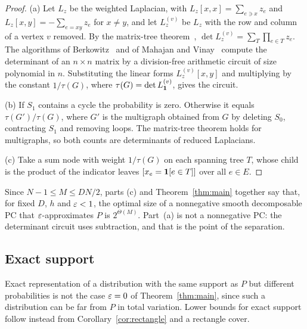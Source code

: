 \begin{proof}
(a) Let $L_z$ be the weighted Laplacian, with $L_z[x,x]=\sum_{e\ni x}z_e$ and $L_z[x,y]=-\sum_{e=xy}z_e$ for $x\ne y$, and let $L_z^{(v)}$ be $L_z$ with the row and column of a vertex $v$ removed. By the matrix-tree theorem~\cite{Kirchhoff1847}, $\det L_z^{(v)}=\sum_T\prod_{e\in T}z_e$. The algorithms of Berkowitz~\cite{Berkowitz84} and of Mahajan and Vinay~\cite{MahajanVinay99} compute the determinant of an $n\times n$ matrix by a division-free arithmetic circuit of size polynomial in $n$. Substituting the linear forms $L_z^{(v)}[x,y]$ and multiplying by the constant $1/\tau(G)$, where $\tau(G)=\det L_{\mathbf{1}}^{(v)}$, gives the circuit.

(b) If $S_1$ contains a cycle the probability is zero. Otherwise it equals $\tau(G')/\tau(G)$, where $G'$ is the multigraph obtained from $G$ by deleting $S_0$, contracting $S_1$ and removing loops. The matrix-tree theorem holds for multigraphs, so both counts are determinants of reduced Laplacians.

(c) Take a sum node with weight $1/\tau(G)$ on each spanning tree $T$, whose child is the product of the indicator leaves $[x_e=\mathbf{1}[e\in T]]$ over all $e\in E$.
\end{proof}

Since $N-1\le M\le DN/2$, parts (c) and Theorem~\ref{thm:main} together say that, for fixed $D$, $h$ and $\varepsilon<1$, the optimal size of a nonnegative smooth decomposable PC that $\varepsilon$-approximates $P$ is $2^{\Theta(M)}$. Part~(a) is not a nonnegative PC: the determinant circuit uses subtraction, and that is the point of the separation.

\subsection{Exact support}\label{sec:support}

Exact representation of a distribution with the same support as $P$ but different probabilities is not the case $\varepsilon=0$ of Theorem~\ref{thm:main}, since such a distribution can be far from $P$ in total variation. Lower bounds for exact support follow instead from Corollary~\ref{cor:rectangle} and a rectangle cover.

